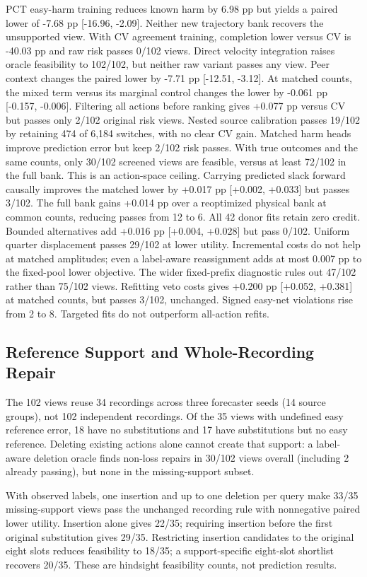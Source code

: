 \documentclass[10pt,twocolumn,letterpaper]{article}
\begin{document}
PCT easy-harm training reduces known harm by 6.98 pp but yields a paired lower of -7.68 pp [-16.96, -2.09]. Neither new trajectory bank recovers the unsupported view. With CV agreement training, completion lower versus CV is -40.03 pp and raw risk passes 0/102 views. Direct velocity integration raises oracle feasibility to 102/102, but neither raw variant passes any view. Peer context changes the paired lower by -7.71 pp [-12.51, -3.12]. At matched counts, the mixed term versus its marginal control changes the lower by -0.061 pp [-0.157, -0.006]. Filtering all actions before ranking gives +0.077 pp versus CV but passes only 2/102 original risk views. Nested source calibration passes 19/102 by retaining 474 of 6,184 switches, with no clear CV gain. Matched harm heads improve prediction error but keep 2/102 risk passes. With true outcomes and the same counts, only 30/102 screened views are feasible, versus at least 72/102 in the full bank. This is an action-space ceiling. Carrying predicted slack forward causally improves the matched lower by +0.017 pp [+0.002, +0.033] but passes 3/102. The full bank gains +0.014 pp over a reoptimized physical bank at common counts, reducing passes from 12 to 6. All 42 donor fits retain zero credit. Bounded alternatives add +0.016 pp [+0.004, +0.028] but pass 0/102. Uniform quarter displacement passes 29/102 at lower utility. Incremental costs do not help at matched amplitudes; even a label-aware reassignment adds at most 0.007 pp to the fixed-pool lower objective. The wider fixed-prefix diagnostic rules out 47/102 rather than 75/102 views. Refitting veto costs gives +0.200 pp [+0.052, +0.381] at matched counts, but passes 3/102, unchanged. Signed easy-net violations rise from 2 to 8. Targeted fits do not outperform all-action refits.


\subsection{Reference Support and Whole-Recording Repair}

The 102 views reuse 34 recordings across three forecaster seeds (14 source groups), not 102 independent recordings. Of the 35 views with undefined easy reference error, 18 have no substitutions and 17 have substitutions but no easy reference. Deleting existing actions alone cannot create that support: a label-aware deletion oracle finds non-loss repairs in 30/102 views overall (including 2 already passing), but none in the missing-support subset.


With observed labels, one insertion and up to one deletion per query make 33/35 missing-support views pass the unchanged recording rule with nonnegative paired lower utility. Insertion alone gives 22/35; requiring insertion before the first original substitution gives 29/35. Restricting insertion candidates to the original eight slots reduces feasibility to 18/35; a support-specific eight-slot shortlist recovers 20/35. These are hindsight feasibility counts, not prediction results.
\end{document}
